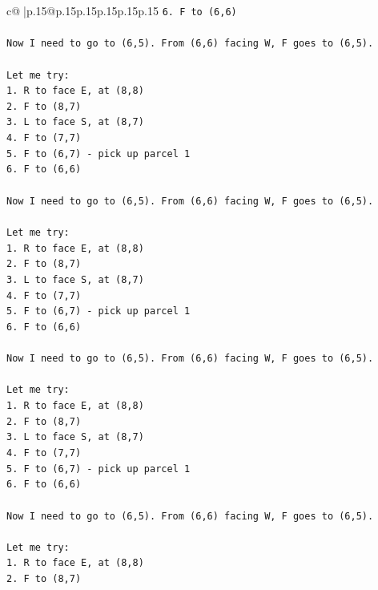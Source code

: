 \documentclass{article}
\begin{document}
{\begin{supertabular}{c@{$\;$}|p{.15\linewidth}@{}p{.15\linewidth}p{.15\linewidth}p{.15\linewidth}p{.15\linewidth}p{.15\linewidth}}
{{{\texttt{6. F to (6,6)} \\
\\ 
\texttt{Now I need to go to (6,5). From (6,6) facing W, F goes to (6,5).} \\
\\ 
\texttt{Let me try:} \\
\texttt{1. R to face E, at (8,8)} \\
\texttt{2. F to (8,7)} \\
\texttt{3. L to face S, at (8,7)} \\
\texttt{4. F to (7,7)} \\
\texttt{5. F to (6,7) {-} pick up parcel 1} \\
\texttt{6. F to (6,6)} \\
\\ 
\texttt{Now I need to go to (6,5). From (6,6) facing W, F goes to (6,5).} \\
\\ 
\texttt{Let me try:} \\
\texttt{1. R to face E, at (8,8)} \\
\texttt{2. F to (8,7)} \\
\texttt{3. L to face S, at (8,7)} \\
\texttt{4. F to (7,7)} \\
\texttt{5. F to (6,7) {-} pick up parcel 1} \\
\texttt{6. F to (6,6)} \\
\\ 
\texttt{Now I need to go to (6,5). From (6,6) facing W, F goes to (6,5).} \\
\\ 
\texttt{Let me try:} \\
\texttt{1. R to face E, at (8,8)} \\
\texttt{2. F to (8,7)} \\
\texttt{3. L to face S, at (8,7)} \\
\texttt{4. F to (7,7)} \\
\texttt{5. F to (6,7) {-} pick up parcel 1} \\
\texttt{6. F to (6,6)} \\
\\ 
\texttt{Now I need to go to (6,5). From (6,6) facing W, F goes to (6,5).} \\
\\ 
\texttt{Let me try:} \\
\texttt{1. R to face E, at (8,8)} \\
\texttt{2. F to (8,7)} \\
}}}
\end{supertabular}}
\end{document}
